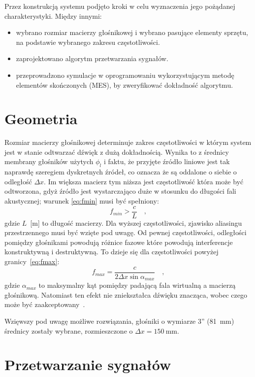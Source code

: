 \documentclass[12pt]{oska}
\let\Oldsection\section
\renewcommand{\section}{\FloatBarrier\Oldsection}
\begin{document}
Przez konstrukcją systemu podjęto kroki w celu wyznaczenia jego pożądanej
charakterystyki. Między innymi:
\begin{itemize}
  \item wybrano rozmiar macierzy głośnikowej i wybrano pasujące elementy
    sprzętu, na podstawie wybranego zakresu częstotliwości.
  \item zaprojektowano algorytm przetwarzania sygnałów.
  \item przeprowadzono symulacje w oprogramowaniu wykorzystującym metodę
    elementów skończonych (MES), by zweryfikować dokładność algorytmu.
\end{itemize}

\section{Geometria}

Rozmiar macierzy głośnikowej determinuje zakres częstotliwości w którym system
jest w stanie odtwarzać dźwięk z dużą dokładnością. Wynika to z średnicy
membrany głośników użytych $\phi_l$ i faktu, że przyjęte źródło liniowe jest
tak naprawdę szeregiem dyskretnych źródeł, co oznacza że są oddalone o siebie o
odległość $\Delta x$. Im większa macierz tym niższa jest częstotliwość która
może być odtworzona, gdyż źródło jest wystarczająco duże w stosunku do długości
fali akustycznej; warunek \eqref{eq:fmin} musi być spełniony:
\begin{equation}
  f_{min}>\frac{c}{L} \quad,	\label{eq:fmin}
\end{equation}
gdzie $L$~[m] to długość macierzy. Dla wyższej częstotliwości, zjawisko
aliasingu przestrzennego musi być wzięte pod uwagę. Od pewnej częstotliwości,
odległości pomiędzy głośnikami powodują różnice fazowe które powodują
interferencje konstruktywną i destruktywną. To dzieje się dla częstotliwości
powyżej granicy~\eqref{eq:fmax}:
\begin{equation}
  f_{max}=\frac{c}{2\Delta x \sin{\alpha_{max}}} \quad, \label{eq:fmax}
\end{equation}
gdzie $\alpha_{max}$ to maksymalny kąt pomiędzy padającą fala wirtualną a
macierzą głośnikową. Natomiast ten efekt nie zniekształca dźwięku znacząca,
wobec czego może być zaakceptowany~\cite{hq_rendering}.

Wzięwszy pod uwagę możliwe rozwiązania, głośniki o wymiarze 3''
(\SI{81}{\milli\meter}) średnicy zostały wybrane, rozmieszczone o
$\Delta x=\SI{150}{\milli\meter}$.

\section{Przetwarzanie sygnałów}\label{s:algorithm}
\end{document}
